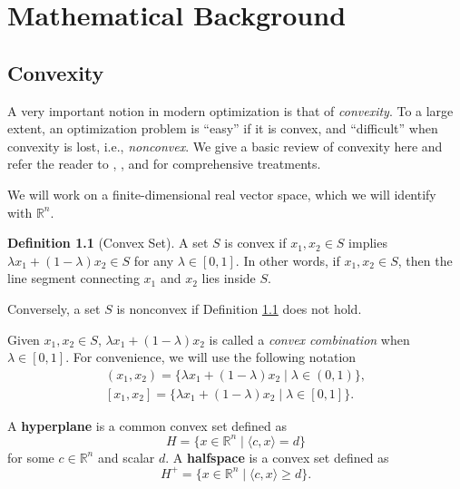 \documentclass[
]{book}
\theoremstyle{definition}
\newtheorem{definition}{Definition}[chapter]
\theoremstyle{definition}
\theoremstyle{definition}
\theoremstyle{definition}
\theoremstyle{remark}
\begin{document}
\chapter{Mathematical Background}\label{background}

\section{Convexity}\label{background:convexity}

A very important notion in modern optimization is that of \emph{convexity}. To a large extent, an optimization problem is ``easy'' if it is convex, and ``difficult'' when convexity is lost, i.e., \emph{nonconvex}. We give a basic review of convexity here and refer the reader to \citep{rockafellar70-convexanalysis}, \citep{boyd04book-convex}, and \citep{bertsekas03book-convex} for comprehensive treatments.

We will work on a finite-dimensional real vector space, which we will identify with \(\mathbb{R}^{n}\).

\begin{definition}[Convex Set]
\protect\hypertarget{def:ConvexSet}{}\label{def:ConvexSet}A set \(S\) is convex if \(x_1,x_2 \in S\) implies \(\lambda x_1 + (1-\lambda) x_2 \in S\) for any \(\lambda \in [0,1]\). In other words, if \(x_1,x_2 \in S\), then the line segment connecting \(x_1\) and \(x_2\) lies inside \(S\).
\end{definition}

Conversely, a set \(S\) is nonconvex if Definition \ref{def:ConvexSet} does not hold.

Given \(x_1, x_2 \in S\), \(\lambda x_1 + (1-\lambda) x_2\) is called a \emph{convex combination} when \(\lambda \in [0,1]\). For convenience, we will use the following notation
\begin{equation}
\begin{split}
(x_1,x_2) = \{ \lambda x_1 + (1-\lambda) x_2 \mid \lambda \in (0,1) \}, \\ [x_1,x_2] = \{ \lambda x_1 + (1-\lambda) x_2 \mid \lambda \in [0,1] \}.
\end{split}
\end{equation}

A \textbf{hyperplane} is a common convex set defined as
\begin{equation}
H = \{  x \in \mathbb{R}^{n} \mid \langle c, x \rangle = d  \}
\label{eq:hyperplane}
\end{equation}
for some \(c \in \mathbb{R}^{n}\) and scalar \(d\). A \textbf{halfspace} is a convex set defined as
\begin{equation}
H^{+} = \{  x \in \mathbb{R}^{n} \mid \langle c, x \rangle \geq d  \}.
\label{eq:halfspace}
\end{equation}
\end{document}
